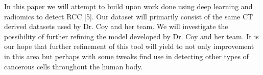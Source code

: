 \documentclass[10pt,journal,compsoc]{IEEEtran}
\begin{document}
In this paper we will attempt to build upon work done using deep learning and radiomics to detect RCC [5].  Our dataset will primarily consist of the same CT derived datasets used by Dr. Coy and her team.  We will investigate the possibility of further refining the model developed by Dr. Coy and her team. It is our hope that further refinement of this tool will yield to not only improvement in this area but perhaps with some tweaks find use in detecting other types of cancerous cells throughout the human body.  


\cleardoublepage

{}


\end{document}
